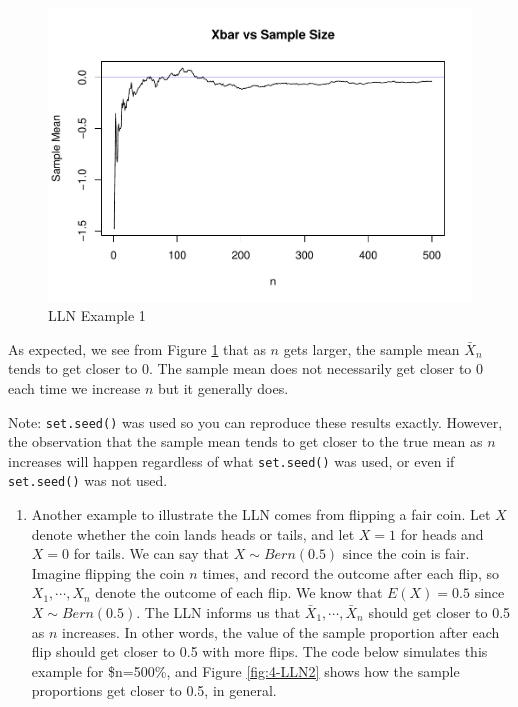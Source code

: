 \documentclass[
]{book}
\providecommand{\tightlist}{%
  \setlength{\itemsep}{0pt}\setlength{\parskip}{0pt}}
\begin{document}
\begin{figure}
\centering
\includegraphics{bookdown-demo_files/figure-latex/4-LLN1-1.pdf}
\caption{\label{fig:4-LLN1}LLN Example 1}
\end{figure}

As expected, we see from Figure \ref{fig:4-LLN1} that as \(n\) gets larger, the sample mean \(\bar{X}_n\) tends to get closer to 0. The sample mean does not necessarily get closer to 0 each time we increase \(n\) but it generally does.

Note: \texttt{set.seed()} was used so you can reproduce these results exactly. However, the observation that the sample mean tends to get closer to the true mean as \(n\) increases will happen regardless of what \texttt{set.seed()} was used, or even if \texttt{set.seed()} was not used.

\begin{enumerate}
\def\labelenumi{\arabic{enumi}.}
\setcounter{enumi}{1}
\tightlist
\item
  Another example to illustrate the LLN comes from flipping a fair coin. Let \(X\) denote whether the coin lands heads or tails, and let \(X=1\) for heads and \(X=0\) for tails. We can say that \(X \sim Bern(0.5)\) since the coin is fair. Imagine flipping the coin \(n\) times, and record the outcome after each flip, so \(X_1, \cdots, X_n\) denote the outcome of each flip. We know that \(E(X) = 0.5\) since \(X \sim Bern(0.5)\). The LLN informs us that \(\bar{X}_1, \cdots, \bar{X}_n\) should get closer to 0.5 as \(n\) increases. In other words, the value of the sample proportion after each flip should get closer to 0.5 with more flips. The code below simulates this example for \$n=500\%, and Figure \ref{fig:4-LLN2} shows how the sample proportions get closer to 0.5, in general.
\end{enumerate}
\end{document}
